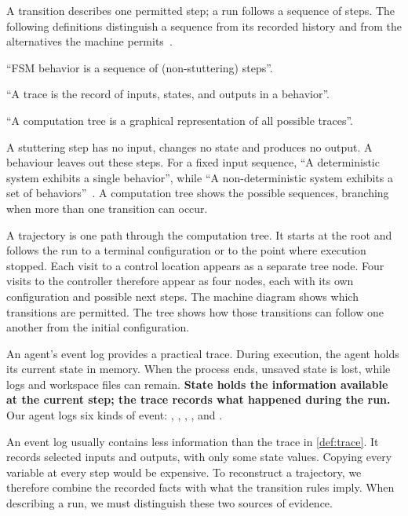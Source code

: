 A transition describes one permitted step; a run follows a sequence of steps. The following
definitions distinguish a sequence from its recorded history and from the alternatives the
machine permits~\citep[slide~8]{seshia2015extended}.

\begin{definition}[Behaviour]
\label{def:behaviour}
``FSM behavior is a sequence of (non-stuttering) steps''.
\end{definition}

\begin{definition}[Trace]
\label{def:trace}
``A trace is the record of inputs, states, and outputs in a behavior''.
\end{definition}

\begin{definition}
\label{def:computation-tree}
``A computation tree is a graphical representation of all possible traces''.
\end{definition}

A stuttering step has no input, changes no state and produces no output. A behaviour leaves out
these steps. For a fixed
input sequence, ``A deterministic system exhibits a single
behavior'', while ``A non-deterministic system exhibits a set of
behaviors''~\citep[slides~29 and~36]{seshia2015discrete}. A computation tree shows the possible
sequences, branching when more than one transition can occur.

A trajectory is one path through the computation tree. It starts at the root and follows the run
to a terminal configuration or to the point where execution stopped. Each visit to a control
location appears as a separate tree node. Four visits to the controller therefore appear as
four nodes, each with its own configuration and possible next steps. The machine diagram shows which
transitions are permitted. The tree shows how those transitions can follow one another from the
initial configuration.

An agent's event log provides a practical trace. During execution, the agent holds its current
state in memory. When the process ends, unsaved state is lost, while logs and workspace files
can remain. \textbf{State holds the information available at the current step; the trace records
what happened during the run.} Our agent logs six kinds of event:
, , , ,
 and .

An event log usually contains less information than the trace in \cref{def:trace}. It records
selected inputs and outputs, with only some state values. Copying every variable at every step
would be expensive. To reconstruct a trajectory, we therefore combine the recorded facts with
what the transition rules imply. When describing a run, we must distinguish these two sources
of evidence.

